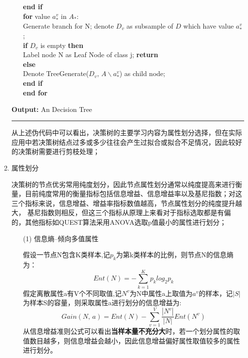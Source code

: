 \documentclass[a4paper]{article}
\begin{document}
\begin{enumerate}
\begin{itemize}
						\textbf{end if}\\
					\textbf{for} value $a_*^{v}$ in $A_*$:\\
						\hspace*{12pt} Generate branch for N; denote $D_v$ as subsample of $D$ which have value $a_*^{v}$;\\
						\hspace*{12pt} \textbf{if} $D_v$ is empty \textbf{then} \\
							\hspace*{24pt} Label node N as Leaf Node of class j; \textbf{return}\\
						\hspace*{12pt} \textbf{else}\\
						\hspace*{21pt} Denote TreeGenerate($D_v,\, A\backslash{a_*^{v}}$) as child node;\\
						\hspace*{12pt} \textbf{end if}\\
					\textbf{end for}
				\end{itemize}
			\textbf{Output:} An Decision Tree\par
			\noindent\rule[0.1\baselineskip]{\textwidth}{0.75pt}

		从上述伪代码中可以看出，决策树的主要学习内容为属性划分选择，但在实际应用中若决策树结点过多或多少往往会产生过拟合或拟合不足情况，因此较好的决策树需要进行剪枝处理；

		\item 属性划分\par
			决策树的节点优劣常用纯度划分，因此节点属性划分通常以纯度提高来进行衡量，目前纯度常用的衡量指标包括信息增益、信息增益率以及基尼指数；对这三个指标来说，信息增益、增益率指标数值越高，节点属性划分的纯度提升越大， 基尼指数则相反，但这三个指标从原理上来看对于指标选取都是有偏的，其他指标如QUEST算法采用ANOVA选取p值最小的属性进行划分；
			\begin{itemize}

					\item[(1)] 信息熵--倾向多值属性\par
						假设一节点N包含K类样本,记$p_k$为第k类样本的比例，则节点N的信息熵为：
						$$Ent(N) = -\sum_{k=1}^{K}p_klog_2p_k$$ 
						假定离散属性a有V个不同取值,记$N^v$为N中属性a上取值为$a^v$的样本，记$|S|$为样本S的容量，则采取属性a进行划分的信息增益为:
						$$Gain(N,\,a) = Ent(N)-\sum_{v=1}^{V}\frac{|N^v|}{|N|}Ent(N^v)$$
						从信息增益准则公式可以看出\textbf{当样本量不充分大}时，若一个划分属性的取值数目越多，则信息增益会越小，因此信息增益偏好属性取值较多的属性进行划分。


\end{itemize}
\end{enumerate}
\end{document}
